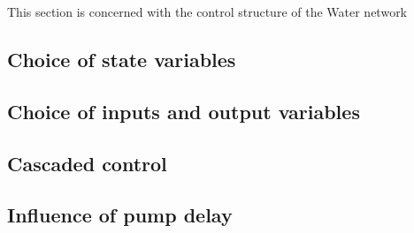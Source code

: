 This section is concerned with the control structure of the Water network


\subsection{Choice of state variables}

\subsection{Choice of inputs and output variables}

\subsection{Cascaded control}

\subsection{Influence of pump delay}

